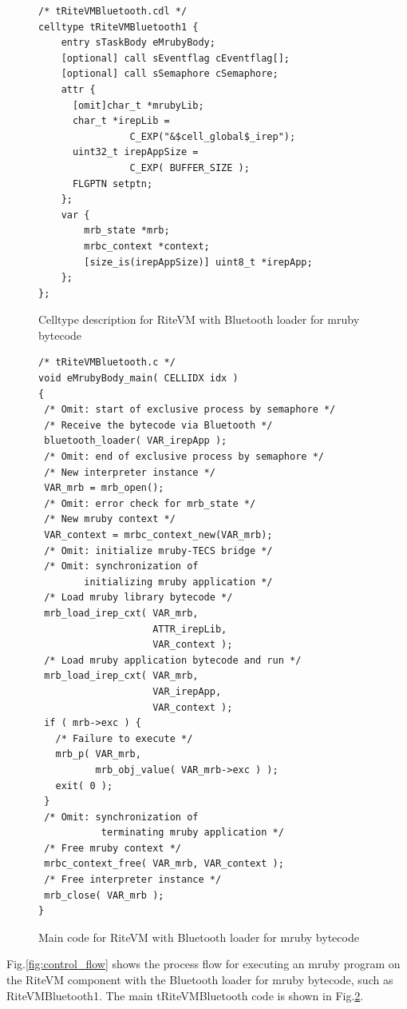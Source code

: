 \documentclass[S,R,E]{article/compsoft}
\begin{document}
\begin{figure}[t]
\centering
\begin{lstlisting}
/* tRiteVMBluetooth.cdl */
celltype tRiteVMBluetooth1 {
    entry sTaskBody eMrubyBody;
    [optional] call sEventflag cEventflag[];
    [optional] call sSemaphore cSemaphore;
    attr {
      [omit]char_t *mrubyLib;
      char_t *irepLib = 
                C_EXP("&$cell_global$_irep");
      uint32_t irepAppSize = 
                C_EXP( BUFFER_SIZE );
      FLGPTN setptn;
    };
    var {
        mrb_state *mrb;
        mrbc_context *context;
        [size_is(irepAppSize)] uint8_t *irepApp;
    };
};
\end{lstlisting}
\caption{Celltype description for RiteVM with Bluetooth loader for mruby bytecode}
\label{celltype_mrubybluetooth}
\end{figure}

\begin{figure}[t]
\centering
\begin{lstlisting}
/* tRiteVMBluetooth.c */
void eMrubyBody_main( CELLIDX idx )
{
 /* Omit: start of exclusive process by semaphore */
 /* Receive the bytecode via Bluetooth */
 bluetooth_loader( VAR_irepApp );
 /* Omit: end of exclusive process by semaphore */
 /* New interpreter instance */
 VAR_mrb = mrb_open();
 /* Omit: error check for mrb_state */
 /* New mruby context */
 VAR_context = mrbc_context_new(VAR_mrb);
 /* Omit: initialize mruby-TECS bridge */
 /* Omit: synchronization of
        initializing mruby application */
 /* Load mruby library bytecode */
 mrb_load_irep_cxt( VAR_mrb,
                    ATTR_irepLib,
                    VAR_context );
 /* Load mruby application bytecode and run */
 mrb_load_irep_cxt( VAR_mrb,
                    VAR_irepApp,
                    VAR_context );
 if ( mrb->exc ) {
   /* Failure to execute */
   mrb_p( VAR_mrb, 
          mrb_obj_value( VAR_mrb->exc ) );
   exit( 0 );
 }
 /* Omit: synchronization of
           terminating mruby application */
 /* Free mruby context */
 mrbc_context_free( VAR_mrb, VAR_context );
 /* Free interpreter instance */
 mrb_close( VAR_mrb );
}

\end{lstlisting}
\caption{Main code for RiteVM with Bluetooth loader for mruby bytecode}
\label{maincode_mrubybluetooth}
\end{figure}

Fig.\ref{fig:control_flow} shows the process flow for executing an mruby program on the RiteVM component with the Bluetooth loader for mruby bytecode, such as RiteVMBluetooth1.
The main tRiteVMBluetooth code is shown in Fig.\ref{maincode_mrubybluetooth}.
\end{document}
